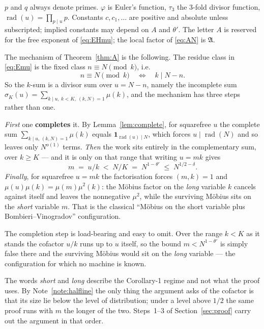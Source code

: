 \documentclass[11pt,a4paper]{article}
\theoremstyle{plain}
\theoremstyle{definition}
\theoremstyle{remark}
\newcommand{\AAA}{\mathfrak{A}}
\DeclareMathOperator{\rad}{rad}
\begin{document}
$p$ and $q$ always denote primes. $\varphi$ is Euler's function,
$\tau_3$ the $3$-fold divisor function, $\rad(u)=\prod_{p\mid u}p$.
Constants $c,c_1,\dots$ are positive and absolute unless subscripted;
implied constants may depend on $A$ and $\theta'$. The letter $A$ is
reserved for the free exponent of \eqref{eq:EHmu}; the local factor of
\eqref{eq:AN} is $\AAA$.

The mechanism of Theorem~\ref{thm:A} is the following. The residue
class in \eqref{eq:Emu} is the fixed class $n\equiv N\pmod k$, i.e.
\[
  n\equiv N\pmod{k}\quad\Longleftrightarrow\quad k\mid N-n .
\]
So the $k$-sum is a divisor sum over $u=N-n$, namely the incomplete
sum $\sigma_K(u)=\sum_{k\mid u,\ k<K,\ (k,N)=1}\mu(k)$, and the
mechanism has three steps rather than one.

\emph{First} one \textbf{completes} it. By Lemma~\ref{lem:complete},
for squarefree $u$ the complete sum
$\sum_{k\mid u,\,(k,N)=1}\mu(k)$ equals $\mathbf 1_{\rad(u)\mid N}$,
which forces $u\mid\rad(N)$ and so leaves only $N^{o(1)}$ terms.
\emph{Then} the work sits entirely in the complementary sum, over
$k\ge K$ --- and it is only on that range that writing $u=mk$ gives
\[
  m\;=\;u/k\;<\;N/K\;=\;N^{1-\theta'}\;\le\;N^{1/2-\delta}.
\]
\emph{Finally}, for squarefree $u=mk$ the factorisation forces
$(m,k)=1$ and $\mu(u)\mu(k)=\mu(m)\mu^2(k)$: the M\"obius factor on
the \emph{long} variable $k$ cancels against itself and leaves the
nonnegative $\mu^2$, while the surviving M\"obius sits on the
\emph{short} variable $m$. That is the classical ``M\"obius on the
short variable plus Bombieri--Vinogradov'' configuration.

The completion step is load-bearing and easy to omit. Over the range
$k<K$ as it stands the cofactor $u/k$ runs up to $u$ itself, so the
bound $m<N^{1-\theta'}$ is simply false there and the surviving
M\"obius would sit on the \emph{long} variable --- the configuration
for which no machine is known.

The words \emph{short} and \emph{long} describe the Corollary-1 regime
and not what the proof uses. By Note~\ref{note:halfline} the only
thing the argument asks of the cofactor is that its size lie below the
level of distribution; under a level above $1/2$ the same proof runs
with $m$ the longer of the two. Steps~1--3 of
Section~\ref{sec:proof} carry out the argument in that order.
\end{document}
